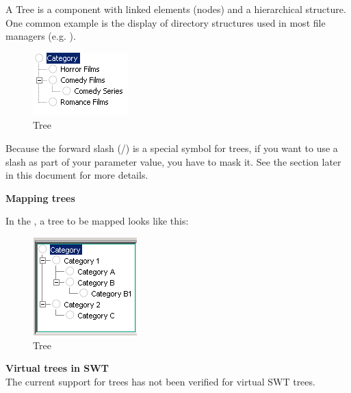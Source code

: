 A Tree is a component with linked
elements (nodes) and a hierarchical structure. One common example is
the display of directory structures used in most file managers
(e.g. ).

\begin{figure}
\begin{center}
\includegraphics{PS/Tree}
\caption{Tree}
\label{tree}
\end{center}
\end{figure}


Because the forward slash (/) is a special symbol for trees, if you want to use a slash as part of your parameter value, you have to mask it. See the section later in this document  for more details. 

\textbf{Mapping trees}

In the \gdomm{}, a tree to be mapped looks like this:

\begin{figure}
\begin{center}
\includegraphics{PS/Maptree}
\caption{Tree}
\label{maptree}
\end{center}
\end{figure}


\textbf{Virtual trees in SWT}\\
The current support for trees has not been verified for virtual SWT trees. 

